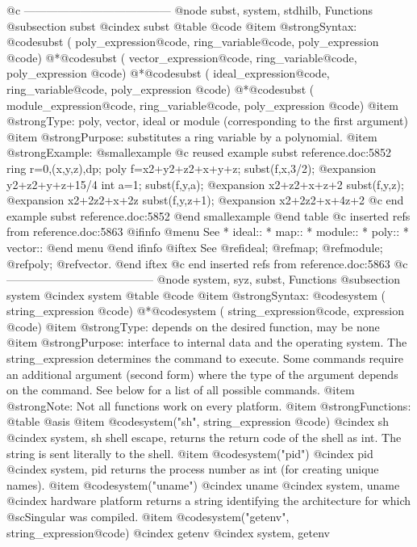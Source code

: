 {{{{{{{@c ---------------------------------------
@node subst, system, stdhilb, Functions
@subsection subst
@cindex subst
@table @code
@item @strong{Syntax:}
@code{subst (} poly_expression@code{,} ring_variable@code{,} poly_expression @code{)}
@*@code{subst (} vector_expression@code{,} ring_variable@code{,} poly_expression @code{)}
@*@code{subst (} ideal_expression@code{,} ring_variable@code{,} poly_expression @code{)}
@*@code{subst (} module_expression@code{,} ring_variable@code{,} poly_expression @code{)}
@item @strong{Type:}
poly, vector, ideal or module (corresponding to the first argument)
@item @strong{Purpose:}
substitutes a ring variable by a polynomial.
@item @strong{Example:}
@smallexample
@c reused example subst reference.doc:5852 
  ring r=0,(x,y,z),dp;
  poly f=x2+y2+z2+x+y+z;
  subst(f,x,3/2);
@expansion{} y2+z2+y+z+15/4
  int a=1;
  subst(f,y,a);
@expansion{} x2+z2+x+z+2
  subst(f,y,z);
@expansion{} x2+2z2+x+2z
  subst(f,y,z+1);
@expansion{} x2+2z2+x+4z+2
@c end example subst reference.doc:5852
@end smallexample
@end table
@c inserted refs from reference.doc:5863
@ifinfo
@menu
See
* ideal::
* map::
* module::
* poly::
* vector::
@end menu
@end ifinfo
@iftex
See
@ref{ideal};
@ref{map};
@ref{module};
@ref{poly};
@ref{vector}.
@end iftex
@c end inserted refs from reference.doc:5863
@c ---------------------------------------
@node  system, syz, subst, Functions
@subsection system
@cindex system
@table @code
@item @strong{Syntax:}
@code{system (} string_expression @code{)}
@*@code{system (} string_expression@code{,} expression @code{)}
@item @strong{Type:}
depends on the desired function, may be none
@item @strong{Purpose:}
interface to internal data and the operating system. The
string_expression determines the command to execute. Some commands
require an additional argument (second form) where the type of the
argument depends on the command. See below for a list of all possible
commands.
@item @strong{Note:}
Not all functions work on every platform.
@item @strong{Functions:}
@table @asis
@item @code{system("sh"}, string_expression @code{)}
@cindex sh
@cindex system, sh
shell escape, returns the return code of the shell as int. The string is
sent literally to the shell.
@item @code{system("pid")}
@cindex pid
@cindex system, pid
returns the process number as int (for creating unique names).
@item @code{system("uname")}
@cindex uname
@cindex system, uname
@cindex hardware platform
returns a string identifying the architecture for which @sc{Singular}
was compiled.
@item @code{system("getenv",} string_expression@code{)}
@cindex getenv
@cindex system, getenv
}}}}}}}
